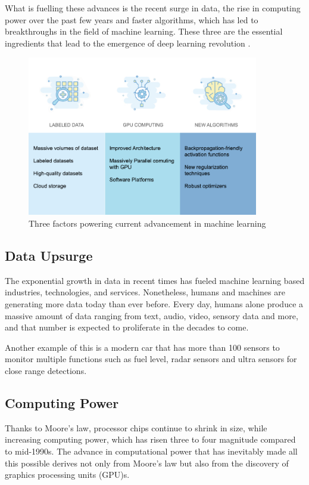 What is fuelling these advances is the recent surge in data, the rise in computing power over the past few years and faster algorithms, which has led to breakthroughs in the field of machine learning. These three are the essential ingredients that lead to the emergence of deep learning revolution \cite{gerrish_how_2018}.

\begin{figure}[htbp]
\centering
\includegraphics[width=0.90\textwidth]{images/bg-drive-factors.png}
\caption{Three factors powering current advancement in machine learning}
\label{3-factors}
\end{figure}

\subsection{Data Upsurge}
The exponential growth in data in recent times has fueled machine learning based industries, technologies, and services. Nonetheless, humans and machines are generating more data today than ever before. Every day, humans alone produce a massive amount of data ranging from text, audio, video, sensory data and more, and that number is expected to proliferate in the decades to come. 

Another example of this is a modern car that has more than 100 sensors to monitor multiple functions such as fuel level, radar sensors and ultra sensors for close range detections.

\subsection{Computing Power}
Thanks to Moore’s law, processor chips continue to shrink in size, while increasing computing power, which has risen three to four magnitude compared to mid-1990s. The advance in computational power that has inevitably made all this possible derives not only from Moore’s law but also from the discovery of graphics processing units (GPU)s.

